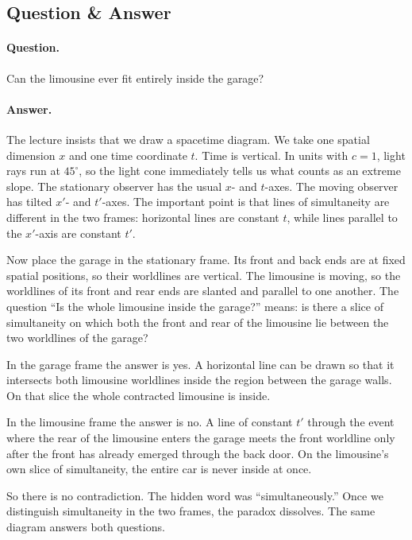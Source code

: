 \subsection{Question \& Answer}

\paragraph{Question.}
Can the limousine ever fit entirely inside the garage?

\paragraph{Answer.}
The lecture insists that we draw a spacetime diagram. We take one spatial dimension \(x\) and one time coordinate \(t\). Time is vertical. In units with \(c=1\), light rays run at \(45^\circ\), so the light cone immediately tells us what counts as an extreme slope. The stationary observer has the usual \(x\)- and \(t\)-axes. The moving observer has tilted \(x'\)- and \(t'\)-axes. The important point is that lines of simultaneity are different in the two frames: horizontal lines are constant \(t\), while lines parallel to the \(x'\)-axis are constant \(t'\).

Now place the garage in the stationary frame. Its front and back ends are at fixed spatial positions, so their worldlines are vertical. The limousine is moving, so the worldlines of its front and rear ends are slanted and parallel to one another. The question ``Is the whole limousine inside the garage?'' means: is there a slice of simultaneity on which both the front and rear of the limousine lie between the two worldlines of the garage?

In the garage frame the answer is yes. A horizontal line can be drawn so that it intersects both limousine worldlines inside the region between the garage walls. On that slice the whole contracted limousine is inside.

In the limousine frame the answer is no. A line of constant \(t'\) through the event where the rear of the limousine enters the garage meets the front worldline only after the front has already emerged through the back door. On the limousine's own slice of simultaneity, the entire car is never inside at once.

So there is no contradiction. The hidden word was ``simultaneously.'' Once we distinguish simultaneity in the two frames, the paradox dissolves. The same diagram answers both questions.

